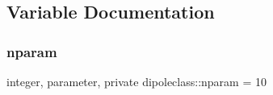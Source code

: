 \subsection{Variable Documentation}
\mbox{\label{namespacedipoleclass_abc619199e1e9a2811da9e97630125da3}} 
\subsubsection{\texorpdfstring{nparam}{nparam}}
{\footnotesize\ttfamily integer, parameter, private dipoleclass\+::nparam = 10\hspace{0.3cm}{\ttfamily [private]}}

